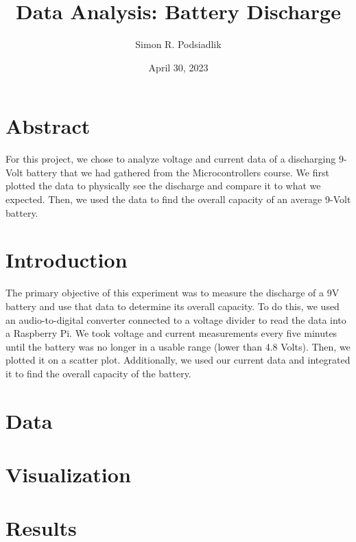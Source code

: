 \documentclass{article}
\author{Simon R. Podsiadlik}
\title{Data Analysis: Battery Discharge}
\date{April 30, 2023}
\begin{document}
\maketitle

\section{Abstract}
For this project, we chose to analyze voltage and current data of a discharging 9-Volt battery that we had gathered from the Microcontrollers course. We first plotted the data to physically see the discharge and compare it to what we expected. Then, we used the data to find the overall capacity of an average 9-Volt battery.

\section{Introduction}
The primary objective of this experiment was to measure the discharge of a 9V battery and use that data to determine its overall capacity. To do this, we used an audio-to-digital converter connected to a voltage divider to read the data into a Raspberry Pi. We took voltage and current measurements every five minutes until the battery was no longer in a usable range (lower than 4.8 Volts). Then, we plotted it on a scatter plot. Additionally, we used our current data and integrated it to find the overall capacity of the battery.
\section{Data}
\section{Visualization}
\section{Results}
\end{document}

